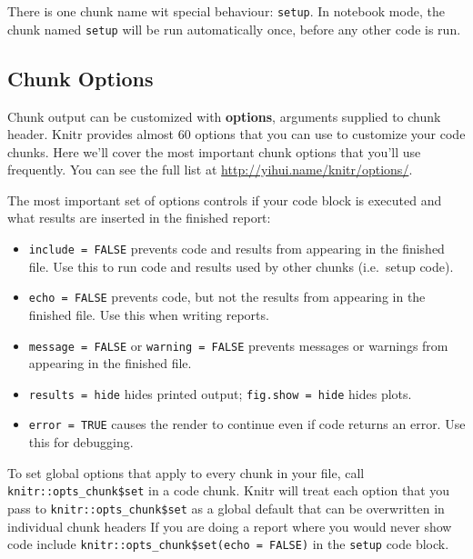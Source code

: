 \documentclass[]{book}
\let\BeginKnitrBlock\begin \let\EndKnitrBlock\end
\begin{document}
\BeginKnitrBlock{rmdimportant}
There is one chunk name wit special behaviour: \texttt{setup}. In
notebook mode, the chunk named \texttt{setup} will be run automatically
once, before any other code is run.
\EndKnitrBlock{rmdimportant}

\subsection{Chunk Options}\label{chunk-options}

Chunk output can be customized with \textbf{options}, arguments supplied
to chunk header. Knitr provides almost 60 options that you can use to
customize your code chunks. Here we'll cover the most important chunk
options that you'll use frequently. You can see the full list at
\url{http://yihui.name/knitr/options/}.

The most important set of options controls if your code block is
executed and what results are inserted in the finished report:

\begin{itemize}
\item
  \texttt{include\ =\ FALSE} prevents code and results from appearing in
  the finished file. Use this to run code and results used by other
  chunks (i.e.~setup code).
\item
  \texttt{echo\ =\ FALSE} prevents code, but not the results from
  appearing in the finished file. Use this when writing reports.
\item
  \texttt{message\ =\ FALSE} or \texttt{warning\ =\ FALSE} prevents
  messages or warnings from appearing in the finished file.
\item
  \texttt{results\ =\ \textquotesingle{}hide\textquotesingle{}} hides
  printed output;
  \texttt{fig.show\ =\ \textquotesingle{}hide\textquotesingle{}} hides
  plots.
\item
  \texttt{error\ =\ TRUE} causes the render to continue even if code
  returns an error. Use this for debugging.
\end{itemize}

To set global options that apply to every chunk in your file, call
\texttt{knitr::opts\_chunk\$set} in a code chunk. Knitr will treat each
option that you pass to \texttt{knitr::opts\_chunk\$set} as a global
default that can be overwritten in individual chunk headers If you are
doing a report where you would never show code include
\texttt{knitr::opts\_chunk\$set(echo\ =\ FALSE)} in the \texttt{setup}
code block.
\end{document}
